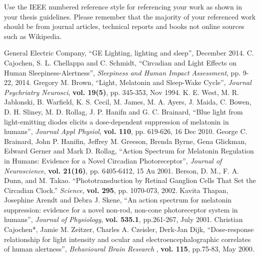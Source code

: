 Use the IEEE numbered reference style for referencing your work as shown in your thesis guidelines.
Please remember that the majority of your referenced work should be from journal articles, technical
reports and books not online sources such as Wikipedia.

\begin{thebibliography}{5}
 General Electric Company, ``GE Lighting, lighting and sleep'', December 2014.
 C. Cajochen, S. L. Chellappa and C. Schmidt, ``Circadian and Light Effects on Human Sleepiness-Alertness'', \emph{Sleepiness and Human Impact Assessment}, pp. 9-22, 2014.
 Gregory M. Brown, ``Light, Melatonin and Sleep-Wake Cycle'', \emph{Journal Psychriatry Neurosci}, {\bf vol. 19(5)}, pp. 345-353, Nov 1994.
 K. E. West, M. R. Jablonski, B. Warfield, K. S. Cecil, M. James, M. A. Ayers, J. Maida, C. Bowen, D. H. Sliney, M. D. Rollag, J. P. Hanifn and G. C. Brainard, ``Blue light from light-emitting diodes elicits a dose-dependent suppression of melatonin in humans'', \emph{Journal Appl Physiol}, {\bf vol. 110}, pp. 619-626, 16 Dec 2010.
 George C. Brainard, John P. Hanifin, Jeffrey M. Greeson, Brenda Byrne, Gena Glickman, Edward Gerner and Mark D. Rollag, ``Action Spectrum for Melatonin Regulation in Humans: Evidence for a Novel Circadian Photoreceptor'', \emph{Journal of Neuroscience}, {\bf vol. 21(16)}, pp. 6405-6412, 15 Au 2001.
 Berson, D. M., F. A. Dunn, and M. Takao. ``Phototransduction by Retinal Ganglion Cells That Set the Circadian Clock.'' \emph{Science}, {\bf vol. 295}, pp. 1070-073, 2002.
 Kavita Thapan, Josephine Arendt and Debra J. Skene, ``An action spectrum for melatonin suppression: evidence for a novel non-rod, non-cone photoreceptor system in humans'', \emph{Journal of Physiology}, {\bf vol. 535.1}, pp.261-267, July 2001.
 Christian  Cajochen*,  Jamie  M.  Zeitzer,  Charles  A.  Czeisler,  Derk-Jan  Dijk, ``Dose-response  relationship  for  light  intensity  and  ocular  and electroencephalographic  correlates  of  human  alertness'', \emph{Behavioural Brain Research }, {\bf vol. 115}, pp.75-83, May 2000.

\end{thebibliography}
